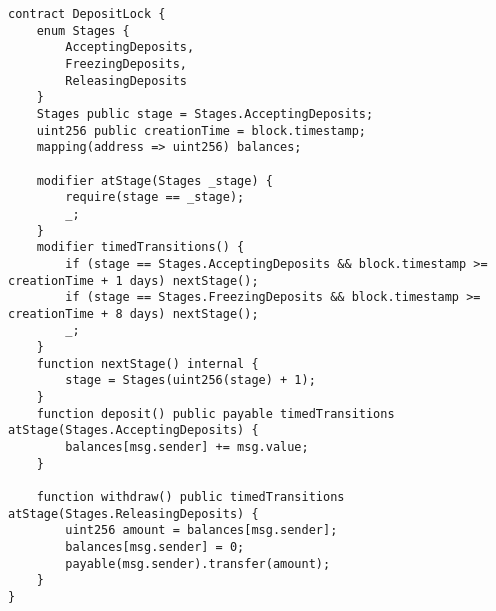 {{\begin{lstlisting}[language=Solidity, caption={Codice di riferimento per State Machine}, label={appendix:state_machine}]
contract DepositLock {
	enum Stages {
		AcceptingDeposits,
		FreezingDeposits,
		ReleasingDeposits
	}
	Stages public stage = Stages.AcceptingDeposits;
	uint256 public creationTime = block.timestamp;
	mapping(address => uint256) balances;
	
	modifier atStage(Stages _stage) {
		require(stage == _stage);
		_;
	}
	modifier timedTransitions() {
		if (stage == Stages.AcceptingDeposits && block.timestamp >= creationTime + 1 days) nextStage();
		if (stage == Stages.FreezingDeposits && block.timestamp >= creationTime + 8 days) nextStage();
		_;
	}
	function nextStage() internal {
		stage = Stages(uint256(stage) + 1);
	}
	function deposit() public payable timedTransitions atStage(Stages.AcceptingDeposits) {
		balances[msg.sender] += msg.value;
	}
	
	function withdraw() public timedTransitions atStage(Stages.ReleasingDeposits) {
		uint256 amount = balances[msg.sender];
		balances[msg.sender] = 0;
		payable(msg.sender).transfer(amount);
	}
}
\end{lstlisting}}}
\newpage
